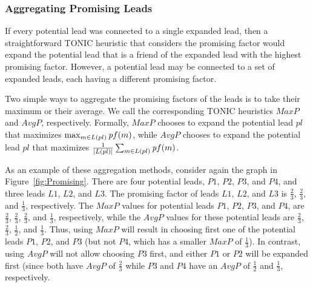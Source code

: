 \documentclass[journal]{IEEEtran}
\newcommand{\pf}{{\textit pf}}
\begin{document}
\subsubsection{Aggregating Promising Leads}

If every potential lead was connected to a single expanded lead, then a straightforward TONIC heuristic that considers the promising factor would expand the potential lead that is a friend of the expanded lead with the highest promising factor. However, a potential lead may be connected to a set of expanded leads, each having a different promising factor.

Two simple ways to aggregate the promising factors of the leads is to take their maximum or their average. We call the corresponding TONIC heuristics $MaxP$ and $AvgP$, respectively. Formally, $MaxP$ chooses to expand the potential lead $pl$ that maximizes $\max_{m\in L(pl)}{\pf(m)}$, while $AvgP$ chooses to expand the potential lead $pl$ that maximizes $\frac{1}{|L(pl)|}\sum_{m\in L(pl)} \pf(m)$. 

As an example of these aggregation methods, consider again the graph in Figure~\ref{fig:Promising}. 
There are four potential leads, $P1$, $P2$, $P3$, and $P4$, and three leads $L1$, $L2$, and $L3$. 
The promising factor of leads $L1$, $L2$, and $L3$ is $\frac{2}{3}$, $\frac{2}{3}$, and 
$\frac{1}{3}$, respectively. 
The $MaxP$ values for potential leads $P1$, $P2$, $P3$, and $P4$, are $\frac{2}{3}$, $\frac{2}{3}$, $\frac{2}{3}$, and $\frac{1}{3}$, respectively, while the $AvgP$ values for these potential leads are $\frac{2}{3}$, $\frac{2}{3}$, $\frac{1}{2}$, and $\frac{1}{3}$. Thus, using $MaxP$ will result in choosing first one of the potential leads $P1$, $P2$, and $P3$ (but not $P4$, which has a smaller $MaxP$ of $\frac{1}{3}$). In contrast, using $AvgP$ will not allow choosing $P3$ first, and either $P1$ or $P2$ will be expanded first (since both have $AvgP$ of $\frac{2}{3}$ while $P3$ and $P4$ have an $AvgP$ of $\frac{1}{2}$ and $\frac{1}{3}$, respectively. 

\end{document}
